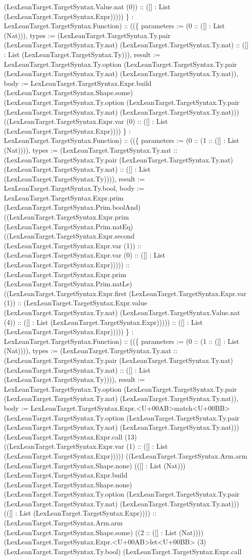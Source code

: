 \documentclass[11pt]{article}
\begin{document}
(LexLeanTarget.TargetSyntax.Value.nat (0)) :: ([] : List (LexLeanTarget.TargetSyntax.Expr))))) \} : LexLeanTarget.TargetSyntax.Function) :: ((\{ parameters := (0 :: ([] : List (Nat))), types := (LexLeanTarget.TargetSyntax.Ty.pair (LexLeanTarget.TargetSyntax.Ty.nat) (LexLeanTarget.TargetSyntax.Ty.nat) :: ([] : List (LexLeanTarget.TargetSyntax.Ty))), result := LexLeanTarget.TargetSyntax.Ty.option (LexLeanTarget.TargetSyntax.Ty.pair (LexLeanTarget.TargetSyntax.Ty.nat) (LexLeanTarget.TargetSyntax.Ty.nat)), body := LexLeanTarget.TargetSyntax.Expr.build (LexLeanTarget.TargetSyntax.Shape.some) (LexLeanTarget.TargetSyntax.Ty.option (LexLeanTarget.TargetSyntax.Ty.pair (LexLeanTarget.TargetSyntax.Ty.nat) (LexLeanTarget.TargetSyntax.Ty.nat))) ((LexLeanTarget.TargetSyntax.Expr.var (0) :: ([] : List (LexLeanTarget.TargetSyntax.Expr)))) \} : LexLeanTarget.TargetSyntax.Function) :: ((\{ parameters := (0 :: (1 :: ([] : List (Nat)))), types := (LexLeanTarget.TargetSyntax.Ty.nat :: (LexLeanTarget.TargetSyntax.Ty.pair (LexLeanTarget.TargetSyntax.Ty.nat) (LexLeanTarget.TargetSyntax.Ty.nat) :: ([] : List (LexLeanTarget.TargetSyntax.Ty)))), result := LexLeanTarget.TargetSyntax.Ty.bool, body := LexLeanTarget.TargetSyntax.Expr.prim (LexLeanTarget.TargetSyntax.Prim.boolAnd) ((LexLeanTarget.TargetSyntax.Expr.prim (LexLeanTarget.TargetSyntax.Prim.natEq) ((LexLeanTarget.TargetSyntax.Expr.second (LexLeanTarget.TargetSyntax.Expr.var (1)) :: (LexLeanTarget.TargetSyntax.Expr.var (0) :: ([] : List (LexLeanTarget.TargetSyntax.Expr))))) :: (LexLeanTarget.TargetSyntax.Expr.prim (LexLeanTarget.TargetSyntax.Prim.natLe) ((LexLeanTarget.TargetSyntax.Expr.first (LexLeanTarget.TargetSyntax.Expr.var (1)) :: (LexLeanTarget.TargetSyntax.Expr.value (LexLeanTarget.TargetSyntax.Ty.nat) (LexLeanTarget.TargetSyntax.Value.nat (4)) :: ([] : List (LexLeanTarget.TargetSyntax.Expr))))) :: ([] : List (LexLeanTarget.TargetSyntax.Expr))))) \} : LexLeanTarget.TargetSyntax.Function) :: ((\{ parameters := (0 :: (1 :: ([] : List (Nat)))), types := (LexLeanTarget.TargetSyntax.Ty.nat :: (LexLeanTarget.TargetSyntax.Ty.pair (LexLeanTarget.TargetSyntax.Ty.nat) (LexLeanTarget.TargetSyntax.Ty.nat) :: ([] : List (LexLeanTarget.TargetSyntax.Ty)))), result := LexLeanTarget.TargetSyntax.Ty.option (LexLeanTarget.TargetSyntax.Ty.pair (LexLeanTarget.TargetSyntax.Ty.nat) (LexLeanTarget.TargetSyntax.Ty.nat)), body := LexLeanTarget.TargetSyntax.Expr.<U+00AB>match<U+00BB> (LexLeanTarget.TargetSyntax.Ty.option (LexLeanTarget.TargetSyntax.Ty.pair (LexLeanTarget.TargetSyntax.Ty.nat) (LexLeanTarget.TargetSyntax.Ty.nat))) (LexLeanTarget.TargetSyntax.Expr.call (13) ((LexLeanTarget.TargetSyntax.Expr.var (1) :: ([] : List (LexLeanTarget.TargetSyntax.Expr))))) ((LexLeanTarget.TargetSyntax.Arm.arm (LexLeanTarget.TargetSyntax.Shape.none) (([] : List (Nat))) (LexLeanTarget.TargetSyntax.Expr.build (LexLeanTarget.TargetSyntax.Shape.none) (LexLeanTarget.TargetSyntax.Ty.option (LexLeanTarget.TargetSyntax.Ty.pair (LexLeanTarget.TargetSyntax.Ty.nat) (LexLeanTarget.TargetSyntax.Ty.nat))) (([] : List (LexLeanTarget.TargetSyntax.Expr)))) :: (LexLeanTarget.TargetSyntax.Arm.arm (LexLeanTarget.TargetSyntax.Shape.some) ((2 :: ([] : List (Nat)))) (LexLeanTarget.TargetSyntax.Expr.<U+00AB>let<U+00BB> (3) (LexLeanTarget.TargetSyntax.Ty.bool) (LexLeanTarget.TargetSyntax.Expr.call 
\end{document}
